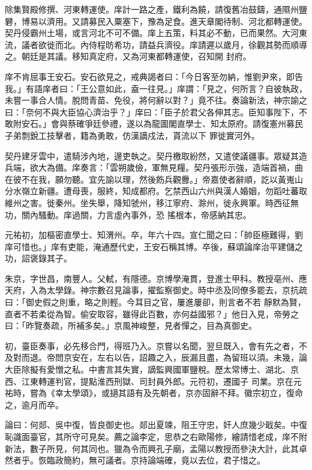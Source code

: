 \begin{pinyinscope}
 除集賢殿修撰、河東轉運使。庠計一路之產，鐵利為饒，請復舊冶鼓鑄，通隰州鹽礬，博易以濟用。又請募民入粟塞下，豫為足食。進天章閣待制、河北都轉運使。契丹侵霸州土場，或言河北不可不備。庠上五策，料其必不動，已而果然。大河東流，議者欲徙而北。內侍程昉希功，請益兵濟役。庠請遲以歲月，徐觀其勢而順導之。朝廷是其議。移知真定府，又為河東都轉運使，召知開
 封府。



 庠不肯屈事王安石。安石欲見之，戒典謁者曰：「今日客至勿納，惟劉尹來，即告我。」有語庠者曰：「王公意如此，盍一往見。」庠謂：「見之，何所言？自彼執政，未嘗一事合人情。脫問青苗、免役，將何辭以對？」竟不往。奏論新法，神宗諭之曰：「奈何不與大臣協心濟治乎？」庠曰：「臣子於君父各伸其志。臣知事陛下，不敢附安石。」會與蔡確爭廷參禮，遂以為龍圖閣直學士、知太原府。請復憲州募民子弟剽銳工技擊者，籍為勇敢，仿漢謫戍法，貰流以下
 罪徙實河外。



 契丹建牙雲中，遣騎涉內地，邊吏執之。契丹檄取紛然，又遣使議疆事。眾疑其造兵端，欲大為備。庠奏言：「雲朔歲儉，軍無見糧。契丹張形示強，造端首禍，曲在彼不在我，願勿聽。宜先諭以理，然後飭兵觀釁。」帝嘉使者辭順，訖以黃嵬山分水嶺立新疆。遭母喪，服終，知成都府。乞禁西山六州與漢人婚姻，勿蹈吐蕃取維州之害。徙秦州。坐失舉，降知虢州，移江寧府、滁州，徙永興軍。時西征無功，關內騷動。庠過關，力言虛內事外，恐
 搖根本，帝感納其忠。



 元祐初，加樞密直學士、知渭州。卒，年六十四。宣仁聞之曰：「帥臣極難得，劉庠可惜也。」庠有吏能，淹通歷代史，王安石稱其博。卒後，蘇頌論庠治平建儲之功，詔褒錄其子。



 朱京，字世昌，南豐人。父軾，有隱德。京博學淹貫，登進士甲科。教授亳州、應天府，入為太學錄。神宗數召見論事，擢監察御史。時中丞及同僚多罷去，京抗疏曰：「御史假之則重，略之則輕。今耳目之官，屢進屢卻，則言者不若
 靜默為賢，直者不若柔從為智。偷安取容，雖得此百數，亦何益國邪？」他日入見，帝勞之曰：「昨覽奏疏，所補多矣。」京風神峻整，見者憚之，目為真御史。



 初，臺臣奏事，必先移合門，得班乃入。京嘗以名聞，翌旦既入，會有先之者，不及對而退。帝問京安在，左右以告，詔趣之入，辰漏且盡，為留班以須。未幾，論大臣除擬有愛憎之私。中書言其失實，謫監興國軍鹽稅。歷太常博士、湖北、京西、江東轉運判官，提點淮西刑獄、司封員外郎。元符初，遷國子
 司業。京在元祐時，嘗為《幸太學頌》，或擿其語有及先朝者，京亦固辭不拜。徽宗初立，復命之，逾月而卒。



 論曰：何郯、吳中復，皆良御史也。郯出夏竦，阻王守忠，奸人庶幾少戢矣。中復恥識面臺官，其所守可見矣。薦之論李定，思恭之右歐陽修，繪請惜老成，庠不附新法，數子所見，何其同也。獵為令而興孔子廟，孟陽以教授而參決大計，此其卓然者乎。恢臨政簡約，無可議者。京持論端確，竟以去位，君子惜之。



\end{pinyinscope}